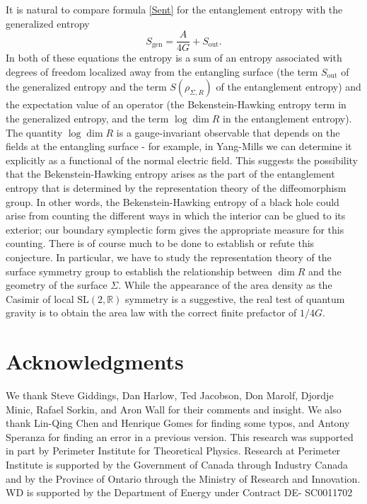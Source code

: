 \documentclass[a4paper,11pt]{article}
\newcommand{\slr}{\text{SL}(2,\mathbb{R})}
\begin{document}
It is natural to compare formula \eqref{Sent} for the entanglement entropy with the generalized entropy
\begin{equation} \label{Sgen}
S_\text{gen} = \frac{A}{4 G} + S_\text{out}.
\end{equation}
In both of these equations the entropy is a sum of an entropy associated with degrees of freedom localized away from the entangling surface (the term $S_\text{out}$ of the generalized entropy and the term $S(\rho_{\Sigma,R})$ of the entanglement entropy) and the expectation value of an operator (the Bekenstein-Hawking entropy term in the generalized entropy, and the term $\log \dim R$ in the entanglement entropy).
The quantity $\log \dim R$ is a gauge-invariant observable that depends on the fields at the entangling surface - for example, in Yang-Mills we can determine it explicitly as a functional of the normal electric field.
This suggests the possibility that the Bekenstein-Hawking entropy arises as the part of the entanglement entropy that is determined by the representation theory of the diffeomorphism group.
In other words, the Bekenstein-Hawking entropy of a black hole could arise from counting the different ways in which the interior can be glued to its exterior; our boundary symplectic form gives the appropriate measure for this counting.
There is of course much to be done to establish or refute this conjecture.
In particular, we have to study the representation theory of the surface symmetry group to establish the relationship between $\dim R$ and the geometry of the surface $\Sigma$.
While the appearance of the area density as the Casimir of local $\slr$ symmetry is a suggestive, the real test of quantum gravity is to obtain the area law with the correct finite prefactor of $1/4G$.


\section*{Acknowledgments}

We thank Steve Giddings, Dan Harlow, Ted Jacobson, Don Marolf, Djordje Minic, Rafael Sorkin, and Aron Wall for their comments and insight.
We also thank Lin-Qing Chen and Henrique Gomes for finding some typos, and Antony Speranza for finding an error in a previous version.
This research was supported in part by Perimeter Institute for Theoretical Physics. 
Research at Perimeter Institute is supported by the Government of Canada through Industry Canada and by the Province of Ontario through the Ministry of Research and Innovation.
WD is supported by the Department of Energy under Contract DE- SC0011702
\end{document}
